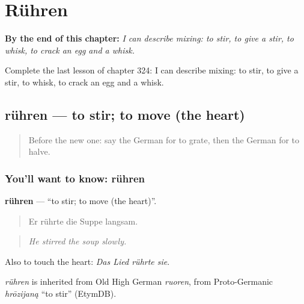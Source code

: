 
\chapter{Rühren}
\label{ch:ge-ruhren}

\begin{chapteropening}
\textbf{By the end of this chapter:} \emph{I can describe mixing: to stir, to give a stir, to whisk, to crack an egg and a whisk.}

Complete the last lesson of chapter 324: I can describe mixing: to stir, to give a stir, to whisk, to crack an egg and a whisk.
\end{chapteropening}

\section[rühren]{rühren — to stir; to move (the heart)}

\label{lesson:GE-C324-ruehren}



\begin{quote}
Before the new one: say the German for to grate, then the German for to halve.
\end{quote}

\subsection*{You'll want to know: rühren}
\textbf{rühren} — \textquotedblleft{}to stir; to move (the heart)\textquotedblright{}.

\begin{quote}
Er rührte die Suppe langsam.
\end{quote}

\begin{quote}
\emph{He stirred the soup slowly.}
\end{quote}

Also to touch the heart: \emph{Das Lied rührte sie}.

\begin{cousinweb}
\emph{rühren} is inherited from Old High German \emph{ruoren}, from Proto-Germanic \emph{hrōzijaną} \textquotedblleft{}to stir\textquotedblright{} (EtymDB).
\end{cousinweb}

